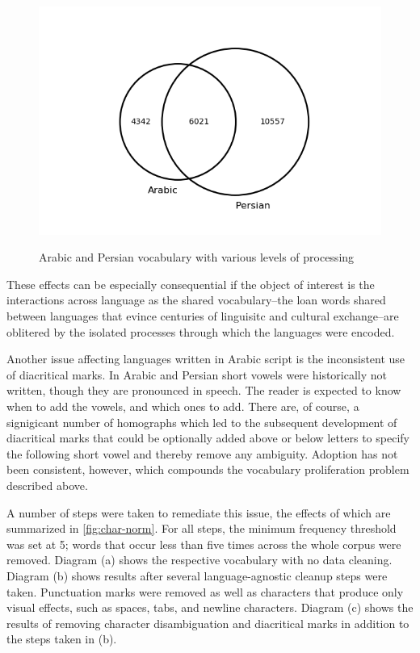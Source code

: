 \documentclass[12pt, oneside]{report}
\begin{document}
\begin{figure}
\begin{minipage}{\linewidth}
		\subcaption{}
		\label{fig:char-norm-b}
		\includegraphics[width=\linewidth]{figures/venn-proc-three-freq5.png}
		\subcaption{}
		\label{fig:char-norm-c}
	\end{minipage}
	\caption[Venn diagrams depicting the effects of various processing decisions]{Arabic and Persian vocabulary with various levels of processing}\label{fig:char-norm}
\end{figure}These effects can be especially consequential if the object of interest is the interactions across language as the shared vocabulary–the loan words shared between languages that evince centuries of linguisitc and cultural exchange–are oblitered by the isolated processes through which the languages were encoded.
\par
Another issue affecting languages written in Arabic script is the inconsistent use of diacritical marks. In Arabic and Persian short vowels were historically not written, though they are
pronounced in speech. The reader is expected to know when to add the vowels, and which ones to add. There are, of course, a signigicant number of homographs which led to the subsequent development of diacritical marks that could be optionally added above or below letters to specify the following short vowel and thereby remove any ambiguity. Adoption has not been consistent, however, which compounds the vocabulary proliferation problem described above.
\par
A number of steps were taken to remediate this issue, the effects of which are summarized in
\autoref{fig:char-norm}. For all steps, the minimum frequency threshold was set at 5; words that occur less than five times across the whole corpus were removed. Diagram (a) shows the respective vocabulary with no data cleaning. Diagram (b) shows results after several language-agnostic cleanup steps were taken. Punctuation marks were removed as well as characters that produce only visual effects, such as spaces, tabs, and newline characters. Diagram (c) shows the results of removing character disambiguation and diacritical marks in addition to the steps taken in (b).
\end{document}

